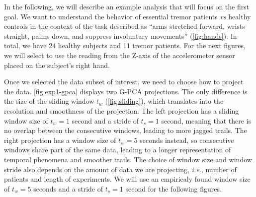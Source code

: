 In the following, we will describe an example analysis that will focus on the first goal. We want to understand the behavior of essential tremor patients \emph{vs} healthy controls in the context of the task described as ``arms stretched forward, wrists straight, palms down, and suppress involuntary movements'' (\cref{fig:hands}). In total, we have 24 healthy subjects and 11 tremor patients. For the next figures, we will select to use the reading from the Z-axis of the accelerometer sensor placed on the subject's right hand. 

Once we selected the data subset of interest, we need to choose how to project the data. \cref{fig:exp1-gpca} displays two G-PCA projections. The only difference is the size of the sliding window $t_w$ (\cref{fig:sliding}), which translates into the resolution and smoothness of the projection. The left projection has a sliding window size of $t_w=1$ second and a stride of $t_s=1$ second, meaning that there is no overlap between the consecutive windows, leading to more jagged trails. The right projection has a window size of $t_w=5$ seconds instead, so consecutive windows share part of the same data, leading to a longer representation of temporal phenomena and smoother trails. The choice of window size and window stride also depends on the amount of data we are projecting, \emph{i.e.}, number of patients and length of experiments. We will use an empiricaly found window size of $t_w=5$ seconds and a stride of $t_s=1$ second for the following figures. 

